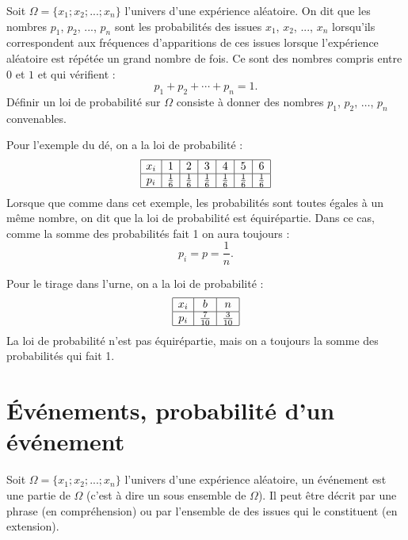 \documentclass[a4paper,11pt,DIV12,BCOR0mm]{scrartcl}
\begin{document}
\begin{definition}
 Soit $\Omega=\{x_1;x_2;...;x_n\}$ l'univers d'une expérience aléatoire. On dit que les 
nombres $p_1$, $p_2$, ..., $p_n$ sont les probabilités des issues $x_1$, $x_2$, ..., $x_n$
lorsqu'ils correspondent aux fréquences d'apparitions de ces issues lorsque l'expérience aléatoire est répétée 
un grand nombre de fois. Ce sont des nombres compris entre $0$ et $1$ et qui vérifient :
\[
 p_1+p_2+\cdots+p_n=1.
\]
Définir un loi de probabilité sur $\Omega$ consiste à donner des nombres $p_1$, $p_2$, $\dots$, $p_n$
convenables.
\end{definition}
\begin{exemple}
 Pour l'exemple du dé, on a la loi de probabilité :
\renewcommand{\arraystretch}{2}
\[
 \begin{array}{|*{7}{c|}}
  \hline
  x_i	&	1	&	2	&	3	&	4	&	5	&	6\\\hline
  p_i	&	\frac16	&	\frac16	&	\frac16	&	\frac16	&	\frac16	&	\frac16\\\hline
 \end{array}
\]
Lorsque que comme dans cet exemple, les probabilités sont toutes égales à un même nombre, on dit
que la loi de probabilité est équirépartie. Dans ce cas, comme la somme des probabilités fait 1
on aura toujours :
\[
 p_i=p=\frac1n.
\]
\end{exemple}
\begin{exemple}
 Pour le tirage dans l'urne, on a la loi de probabilité :
\renewcommand{\arraystretch}{2}
\[
 \begin{array}{|*{7}{c|}}
  \hline
  x_i	&	b		&	n		\\\hline
  p_i	&	\frac{7}{10}	&	\frac{3}{10}	\\\hline
 \end{array}
\]
La loi de probabilité n'est pas équirépartie, mais on a toujours
la somme des probabilités qui fait 1. 
\end{exemple}


\section{\'Evénements, probabilité d'un événement}
\begin{definition}
 Soit $\Omega=\{x_1;x_2;...;x_n\}$ l'univers d'une expérience aléatoire,
un événement est une partie de $\Omega$ (c'est à dire un sous ensemble
de $\Omega$). Il peut être décrit par une phrase (en compréhension) ou par l'ensemble de 
des issues qui le constituent (en extension).
\end{definition}
\end{document}
